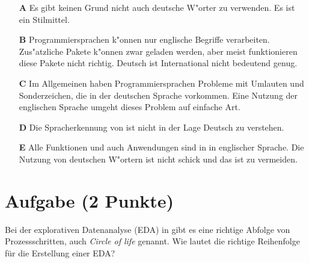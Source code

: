 \documentclass[a4paper, 10pt]{scrartcl}\usepackage[]{graphicx}\usepackage[]{xcolor}
\begin{document}
\begin{enumerate}
\item [\textbf{A} \msquare] Es gibt keinen Grund nicht auch deutsche W{"o}rter zu verwenden. Es ist ein Stilmittel.
\item [\textbf{B} \msquare] Programmiersprachen k{"o}nnen nur englische Begriffe verarbeiten. Zus{"a}tzliche Pakete k{"o}nnen zwar geladen werden, aber meist funktionieren diese Pakete nicht richtig. Deutsch ist International nicht bedeutend genug.
\item [\textbf{C} \msquare] Im Allgemeinen haben Programmiersprachen Probleme mit Umlauten und Sonderzeichen, die in der deutschen Sprache vorkommen. Eine Nutzung der englischen Sprache umgeht dieses Problem auf einfache Art.
\item [\textbf{D} \msquare] Die Spracherkennung von \Rlogo ist nicht in der Lage Deutsch zu verstehen.
\item [\textbf{E} \msquare] Alle Funktionen und auch Anwendungen sind in \Rlogo in englischer Sprache. Die Nutzung von deutschen W{"o}rtern ist nicht schick und das ist zu vermeiden.
\end{enumerate}

\section{Aufgabe \hfill (2 Punkte)}

Bei der explorativen Datenanalyse (EDA) in \Rlogo gibt es eine richtige Abfolge von Prozessschritten, auch \textit{Circle of life} genannt. Wie lautet die richtige Reihenfolge f{\"u}r die Erstellung einer EDA?
\end{document}

